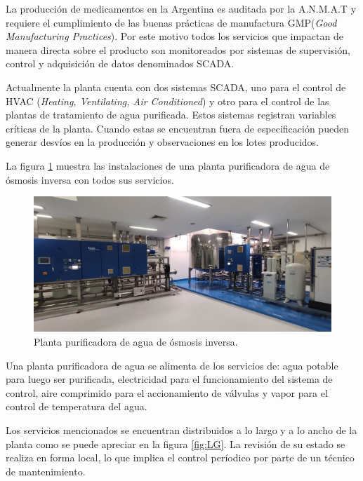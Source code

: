 La producción de medicamentos en la Argentina es auditada por la A.N.M.A.T \citep{ANMAT} y requiere el cumplimiento de las buenas prácticas de manufactura GMP(\emph{Good Manufacturing Practices}). Por este motivo todos los servicios que impactan de manera directa sobre el producto son monitoreados por sistemas de supervisión, control y adquisición de datos denominados SCADA.

Actualmente la planta cuenta con dos sistemas SCADA, uno para el control de HVAC (\emph{Heating, Ventilating, Air Conditioned}) y otro para el control de las plantas de tratamiento de agua purificada. 
Estos sistemas registran variables críticas de la planta. Cuando estas se encuentran fuera de especificación pueden generar desvíos en la producción y observaciones en los lotes producidos.

La figura \ref{fig:PWNB} muestra las instalaciones de una planta purificadora de agua de ósmosis inversa con todos sus servicios.

\begin{figure}[htbp]
	\centering
	\includegraphics[width=1\textwidth]{./Figures/PWNB.png}
	\caption{Planta purificadora de agua de ósmosis inversa.}
	\label{fig:PWNB}
\end{figure}

Una planta purificadora de agua se alimenta de los servicios de: agua potable para luego ser purificada, electricidad para el funcionamiento del sistema de control, aire comprimido para el accionamiento de válvulas y vapor para el control de temperatura del agua.

Los servicios mencionados se encuentran distribuidos a lo largo y a lo ancho de la planta como se puede apreciar en la figura \ref{fig:LG}. La revisión de su estado se realiza en forma local, lo que implica el control períodico por parte de un técnico de mantenimiento.


